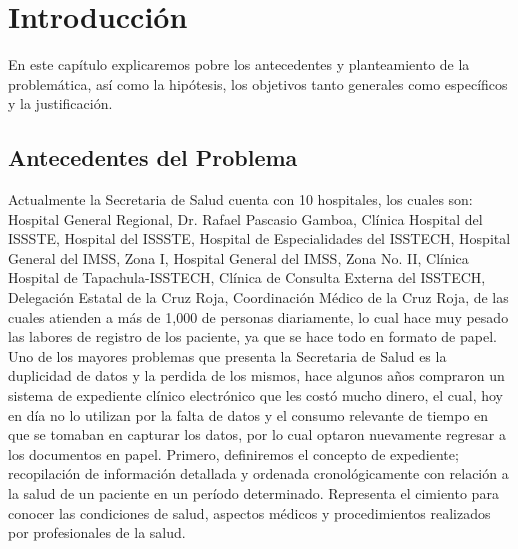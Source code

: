 \chapter{Introducción}
En este capítulo explicaremos pobre los antecedentes y planteamiento de la problemática, así como la hipótesis, los objetivos tanto generales como específicos y la justificación.


\section{Antecedentes del Problema}
Actualmente la Secretaria de Salud  cuenta con 10 hospitales, los cuales son: Hospital General Regional, Dr. Rafael Pascasio Gamboa, Clínica Hospital del ISSSTE, Hospital del ISSSTE, Hospital de Especialidades del ISSTECH, Hospital General del IMSS, Zona I, Hospital General del IMSS, Zona No. II, Clínica Hospital de Tapachula-ISSTECH, Clínica de Consulta Externa del ISSTECH, Delegación Estatal de la Cruz Roja, Coordinación Médico de la Cruz Roja, de las cuales atienden a más de 1,000 de personas diariamente, lo cual hace muy pesado las labores de registro de los paciente, ya que se hace todo en formato de papel. Uno de los mayores problemas que presenta la Secretaria de Salud es la duplicidad de datos y la perdida de los mismos, hace algunos años compraron un sistema de expediente clínico electrónico que les costó mucho dinero, el cual, hoy en día no lo utilizan por la falta de datos y el consumo relevante de tiempo en que se tomaban en capturar los datos, por lo cual optaron nuevamente regresar a los documentos en papel.
Primero, definiremos el concepto de expediente; recopilación de información detallada y ordenada cronológicamente con relación a la salud de un paciente en un período determinado. Representa el cimiento para conocer las condiciones de salud, aspectos médicos y procedimientos realizados por profesionales de la salud.\cite{Gracia}
